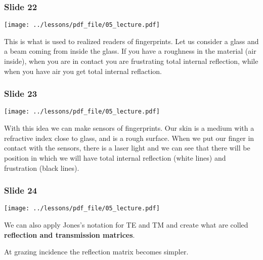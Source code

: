\documentclass[../main/main.tex]{subfiles}
\begin{document}
\subsubsection*{Slide 22}

\begin{minipage}[]{0.5\linewidth}
\centering
\texttt{[image: ../lessons/pdf\_file/05\_lecture.pdf]}
\end{minipage}
\hspace{0.3cm}\vspace{0.3cm}
\begin{minipage}[c]{0.47\linewidth}

This is what is used to realized readers of fingerprints. Let us consider a glass and a beam coming from inside the glass. If you have a roughness in the material (air inside), when you are in contact you are frustrating total internal reflection, while when you have air you get total internal reflaction.

\end{minipage}


\subsubsection*{Slide 23}

\begin{minipage}[]{0.5\linewidth}
\centering
\texttt{[image: ../lessons/pdf\_file/05\_lecture.pdf]}
\end{minipage}
\hspace{0.3cm}\vspace{0.3cm}
\begin{minipage}[c]{0.47\linewidth}

With this idea we can make sensors of fingerprints. Our skin is a medium with a refractive index close to glass, and is a rough surface. When we put our finger in contact with the sensors, there is a laser light and we can see that there will be position in which we will have total internal reflection (white lines) and frustration (black lines).

\end{minipage}


\subsubsection*{Slide 24}

\begin{minipage}[]{0.5\linewidth}
\centering
\texttt{[image: ../lessons/pdf\_file/05\_lecture.pdf]}
\end{minipage}
\hspace{0.3cm}\vspace{0.3cm}
\begin{minipage}[c]{0.47\linewidth}

We can also apply Jones's notation for TE and TM and create what are colled \textbf{reflection and transmission matrices}.

At grazing incidence the reflection matrix becomes simpler.


\end{minipage}
\end{document}
